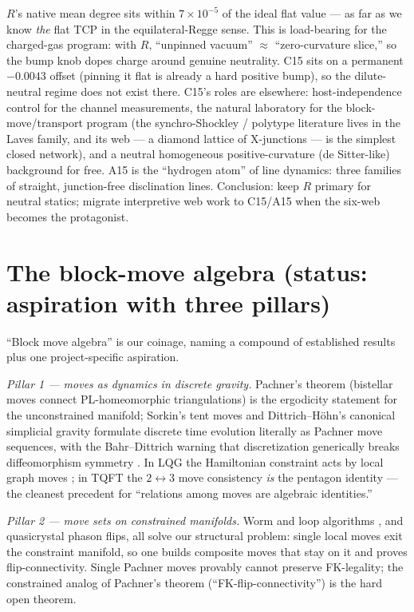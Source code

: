\documentclass[11pt]{article}
\begin{document}
$R$'s native mean degree sits within $7\times10^{-5}$ of the ideal flat
value --- as far as we know \emph{the} flat TCP in the equilateral-Regge
sense. This is load-bearing for the charged-gas program: with $R$,
``unpinned vacuum'' $\approx$ ``zero-curvature slice,'' so the bump knob
dopes charge around genuine neutrality. C15 sits on a permanent $-0.0043$
offset (pinning it flat is already a hard positive bump), so the
dilute-neutral regime does not exist there. C15's roles are elsewhere:
host-independence control for the channel measurements, the natural
laboratory for the block-move/transport program (the synchro-Shockley /
polytype literature lives in the Laves family, and its web --- a diamond
lattice of X-junctions --- is the simplest closed network), and a neutral
homogeneous positive-curvature (de Sitter-like) background for free. A15 is
the ``hydrogen atom'' of line dynamics: three families of straight,
junction-free disclination lines. Conclusion: keep $R$ primary for neutral
statics; migrate interpretive web work to C15/A15 when the six-web becomes
the protagonist.

\section{The block-move algebra (status: aspiration with three pillars)}
\label{sec:blockmoves}

``Block move algebra'' is our coinage, naming a compound of established
results plus one project-specific aspiration.

\emph{Pillar 1 --- moves as dynamics in discrete gravity.} Pachner's theorem
\cite{pachner} (bistellar moves connect PL-homeomorphic triangulations) is
the ergodicity statement for the unconstrained manifold; Sorkin's tent moves
\cite{sorkin} and Dittrich--H\"ohn's canonical simplicial gravity
\cite{dittrich-hohn} formulate discrete time evolution literally as Pachner
move sequences, with the Bahr--Dittrich warning that discretization
generically breaks diffeomorphism symmetry \cite{bahr-dittrich}. In LQG the
Hamiltonian constraint acts by local graph moves \cite{thiemann}; in TQFT
the $2\!\leftrightarrow\!3$ move consistency \emph{is} the pentagon identity
--- the cleanest precedent for ``relations among moves are algebraic
identities.''

\emph{Pillar 2 --- move sets on constrained manifolds.} Worm and loop
algorithms \cite{prokofev-svistunov}, and quasicrystal phason flips, all
solve our structural problem: single local moves exit the constraint
manifold, so one builds composite moves that stay on it and proves
flip-connectivity. Single Pachner moves provably cannot preserve
FK-legality; the constrained analog of Pachner's theorem
(``FK-flip-connectivity'') is the hard open theorem.
\end{document}
